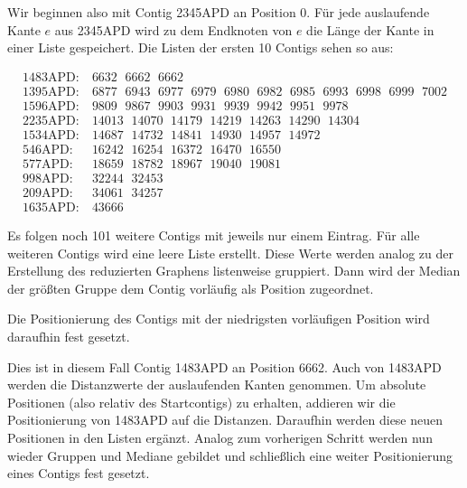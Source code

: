 Wir beginnen also mit Contig 2345APD an Position 0. Für jede auslaufende Kante $e$ aus 2345APD wird zu dem Endknoten von $e$ die Länge der Kante in einer Liste gespeichert. Die Listen der ersten 10 Contigs sehen so aus: 

\begin{footnotesize}
	\begin{align*}
	\text{1483APD:}&\ 6632\ \ \,6662\ \ \,6662\\
	\text{1395APD:}&\ 6877\ \ \,6943\ \ \,6977\ \ \,6979\ \ \,6980\ \ \,6982\ \ \,6985\ \ \,6993\ \ \,6998\ \ \,6999\ \ \,7002\\
	\text{1596APD:}&\ 9809\ \ \,9867\ \ \,9903\ \ \,9931\ \ \,9939\ \ \,9942\ \ \,9951\ \ \,9978\\
	\text{2235APD:}&\ 14013\ \ \,14070\ \ \,14179\ \ \,14219\ \ \,14263\ \ \,14290\ \ \,14304\\
	\text{1534APD:}&\ 14687\ \ \,14732\ \ \,14841\ \ \,14930\ \ \,14957\ \ \,14972\\
	\text{546APD:}&\ 16242\ \ \,16254\ \ \,16372\ \ \,16470\ \ \,16550\\
	\text{577APD:}&\ 18659\ \ \,18782\ \ \,18967\ \ \,19040\ \ \,19081\\
	\text{998APD:}&\ 32244\ \ \,32453\\
	\text{209APD:}&\ 34061\ \ \,34257\\
	\text{1635APD:}&\ 43666
	\end{align*}
\end{footnotesize}

Es folgen noch 101 weitere Contigs mit jeweils nur einem Eintrag. 
Für alle weiteren Contigs wird eine leere Liste erstellt.
Diese Werte werden analog zu der Erstellung des reduzierten Graphens listenweise gruppiert. Dann wird der Median der größten Gruppe dem Contig vorläufig als Position zugeordnet.

Die Positionierung des Contigs mit der niedrigsten vorläufigen Position wird daraufhin fest gesetzt.

Dies ist in diesem Fall Contig 1483APD an Position 6662. Auch von 1483APD werden die Distanzwerte der auslaufenden Kanten genommen. 
Um absolute Positionen (also relativ des Startcontigs) zu erhalten, addieren wir die Positionierung von 1483APD auf die Distanzen. Daraufhin werden diese neuen Positionen in den Listen ergänzt. Analog zum vorherigen Schritt werden nun wieder Gruppen und Mediane gebildet und schließlich eine weiter Positionierung eines Contigs fest gesetzt.

